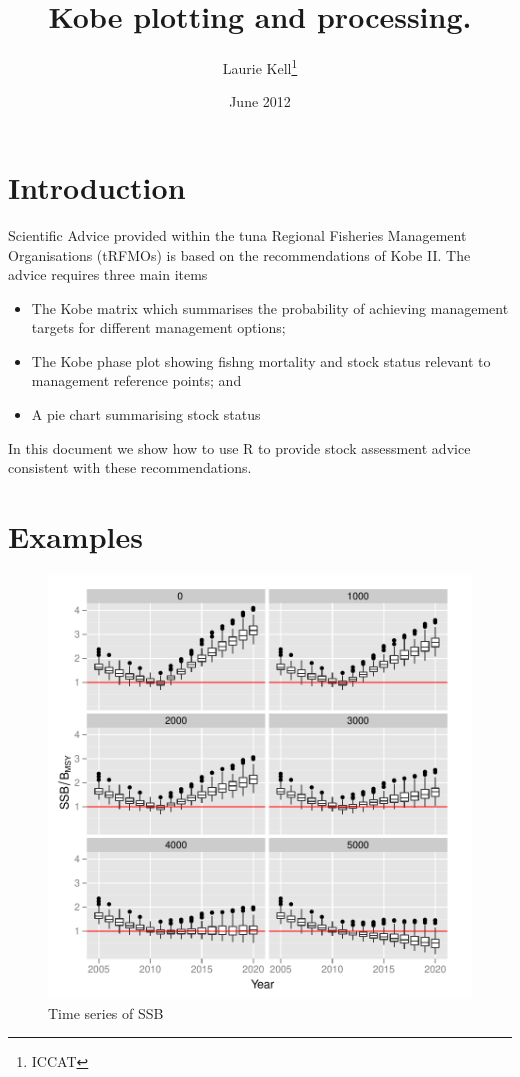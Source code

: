 \documentclass[a4paper, 11pt, oldtoc]{artikel1}
\begin{document}
\title{Kobe plotting and processing.}
\author{Laurie Kell\footnote{ICCAT}}
\date{June 2012}
\maketitle
\tableofcontents

\section{Introduction}

Scientific Advice provided within the tuna Regional Fisheries Management Organisations (tRFMOs) is based on the recommendations of Kobe II. 
The advice requires three main items 

\begin{itemize}
 \item The Kobe matrix which summarises the probability of achieving management targets for different management options;
 \item The Kobe phase plot showing fishng mortality and stock status relevant to management reference points; and
 \item  A pie chart summarising stock status 
\end{itemize}

In this document we show how to use R to provide stock assessment advice consistent with these recommendations.
 
\section{Examples}




\begin{figure}
\begin{center}
\includegraphics{kobe-003}
\caption{Time series of SSB}
\end{center}
\end{figure}
\end{document}
